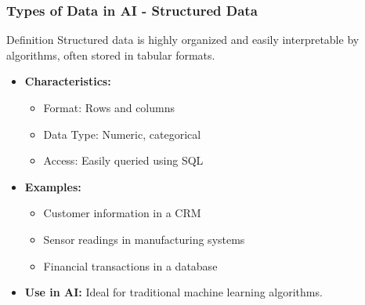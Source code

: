 \documentclass[aspectratio=169]{beamer}
\begin{document}
\begin{frame}[fragile]
    \frametitle{Types of Data in AI - Structured Data}
    \begin{block}{Definition}
        Structured data is highly organized and easily interpretable by algorithms, often stored in tabular formats.
    \end{block}
    \begin{itemize}
        \item \textbf{Characteristics:}
        \begin{itemize}
            \item Format: Rows and columns
            \item Data Type: Numeric, categorical
            \item Access: Easily queried using SQL
        \end{itemize}
        
        \item \textbf{Examples:}
        \begin{itemize}
            \item Customer information in a CRM
            \item Sensor readings in manufacturing systems
            \item Financial transactions in a database
        \end{itemize}
        
        \item \textbf{Use in AI:} Ideal for traditional machine learning algorithms.
    \end{itemize}
\end{frame}
\end{document}
